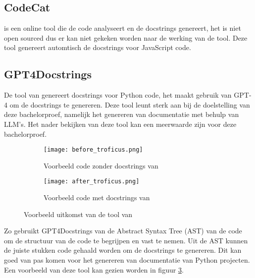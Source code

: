 \subsection{CodeCat}
\textcite{CodeCat2024} is een online tool die de code analyseert en de docstrings genereert, het is niet open sourced dus er kan niet gekeken worden naar de werking van de tool.
Deze tool genereert automtisch de docstrings voor JavaScript code.

\subsection{GPT4Docstrings}
De tool van \textcite{Trofficus2023} genereert docstrings voor Python code, het maakt gebruik van GPT-4 \autocite{OpenAI2023} om de docstrings te genereren.
Deze tool leunt sterk aan bij de doelstelling van deze bachelorproef, namelijk het genereren van documentatie met behulp van LLM's.
Het nader bekijken van deze tool kan een meerwaarde zijn voor deze bachelorproef.

\begin{figure}
  \centering
  \begin{subfigure}[b]{0.5\textwidth}
      \centering
      \texttt{[image: before\_troficus.png]}
      \caption{Voorbeeld code zonder docstrings van \textcite{Trofficus2023}}
      \label{fig:before-Trofficus}
  \end{subfigure}
  \hfill
  \begin{subfigure}[b]{0.5\textwidth}
      \centering
      \texttt{[image: after\_troficus.png]}
      \caption{Voorbeeld code met docstrings van \textcite{Trofficus2023}}
      \label{fig:after-Trofficus}
  \end{subfigure}
     \caption[Uitkomst GPT4Docstrings]{Voorbeeld uitkomst van de tool van \textcite{Trofficus2023}}
     \label{fig:Before-After-Trofficus}
\end{figure}

Zo gebruikt GPT4Docstrings van \textcite{Trofficus2023} de Abstract Syntax Tree (AST) van de code om de structuur van de code te begrijpen en vast te nemen.
Uit de AST kunnen de juiste stukken code gehaald worden om de docstrings te genereren.
Dit kan goed van pas komen voor het genereren van documentatie van Python projecten.
Een voorbeeld van deze tool kan gezien worden in figuur \ref{fig:Before-After-Trofficus}. 

